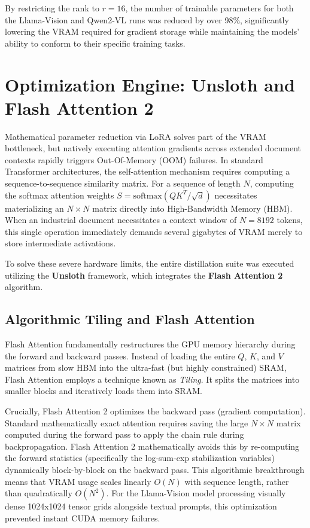 By restricting the rank to $r = 16$, the number of trainable parameters for both the Llama-Vision and Qwen2-VL runs was reduced by over 98\%, significantly lowering the VRAM required for gradient storage while maintaining the models' ability to conform to their specific training tasks.

\section{Optimization Engine: Unsloth and Flash Attention 2}
\label{sec:unsloth_training}

Mathematical parameter reduction via LoRA solves part of the VRAM bottleneck, but natively executing attention gradients across extended document contexts rapidly triggers Out-Of-Memory (OOM) failures. In standard Transformer architectures, the self-attention mechanism requires computing a sequence-to-sequence similarity matrix. For a sequence of length $N$, computing the softmax attention weights $S = \text{softmax}(QK^T / \sqrt{d})$ necessitates materializing an $N \times N$ matrix directly into High-Bandwidth Memory (HBM). When an industrial document necessitates a context window of $N=8192$ tokens, this single operation immediately demands several gigabytes of VRAM merely to store intermediate activations.

To solve these severe hardware limits, the entire distillation suite was executed utilizing the \textbf{Unsloth} \citep{unsloth} framework, which integrates the \textbf{Flash Attention 2} \citep{flash_attention} algorithm.

\subsection{Algorithmic Tiling and Flash Attention}
Flash Attention fundamentally restructures the GPU memory hierarchy during the forward and backward passes. Instead of loading the entire $Q$, $K$, and $V$ matrices from slow HBM into the ultra-fast (but highly constrained) SRAM, Flash Attention employs a technique known as \textit{Tiling}. It splits the matrices into smaller blocks and iteratively loads them into SRAM. 

Crucially, Flash Attention 2 optimizes the backward pass (gradient computation). Standard mathematically exact attention requires saving the large $N \times N$ matrix computed during the forward pass to apply the chain rule during backpropagation. Flash Attention 2 mathematically avoids this by re-computing the forward statistics (specifically the log-sum-exp stabilization variables) dynamically block-by-block on the backward pass. This algorithmic breakthrough means that VRAM usage scales linearly $O(N)$ with sequence length, rather than quadratically $O(N^2)$. For the Llama-Vision model processing visually dense 1024x1024 tensor grids alongside textual prompts, this optimization prevented instant CUDA memory failures.

